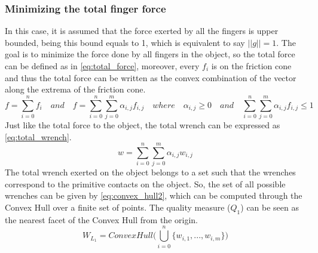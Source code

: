\subsubsection{Minimizing the total finger force}
In this case, it is assumed that the force exerted by all the fingers is upper bounded, being this bound equals to 1, which is equivalent to say $||g|| = 1$.
The goal is to minimize the force done by all fingers in the object, so the total force can be defined as in \eqref{eq:total_force}, moreover, every $f_i$ is on the friction cone and thus the total force can be written as the convex combination of the vector along the extrema of the friction cone.
\begin{equation}\label{eq:total_force}
    f= \sum_{i=0}^{n}f_i \quad and \quad
    f= \sum_{i=0}^{n}\sum_{j=0}^{m}\alpha_{i,j}f_{i,j} \quad where \quad \alpha_{i,j} \ge 0 \quad and \quad \sum_{i=0}^{n}\sum_{j=0}^{m}\alpha_{i,j}f_{i,j} \le 1
\end{equation}
Just like the total force to the object, the total wrench can be expressed as \eqref{eq:total_wrench}.
\begin{equation}\label{eq:total_wrench}
    w= \sum_{i=0}^{n}\sum_{j=0}^{m}\alpha_{i,j}w_{i,j}
\end{equation}
The total wrench exerted on the object belongs to a set such that the wrenches correspond to the primitive contacts on the object. So, the set of all possible wrenches can be given by \eqref{eq:convex_hull2}, which can be computed through the Convex Hull over a finite set of points. The quality measure ($Q_1$) can be seen as the nearest facet of the Convex Hull from the origin.
\begin{equation}\label{eq:convex_hull2}
    W_{L_1}= Convex Hull\Bigg(\bigcup_{i=0}^{n}\{w_{i,1},..., w_{i,m}\}\Bigg)
\end{equation}
